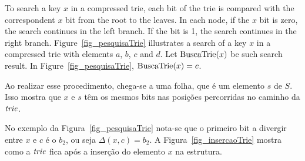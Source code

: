 \documentclass[11pt]{article}
\newcommand{\tr}{\mbox{\rm\emph{trie}}}
\newcommand{\trs}[1]{\mbox{\rm{BuscaTrie}}(#1)}
\newcommand{\dlt}[2]{\Delta(#1,#2)}
\begin{document}
To search a key $x$ in a compressed trie, each bit of the trie is compared with the correspondent $x$ bit from the root to the leaves. In each node, if the $x$ bit is zero, the search continues in the left branch. If the bit is 1, the search continues in the right branch. Figure~\ref{fig_pesquisaTrie}  illustrates a search of a key $x$ in a compressed trie with elements $a$, $b$, $c$ and $d$. Let $\trs{x}$ be such search result. In Figure~\ref{fig_pesquisaTrie},  $\trs{x}=c$.





Ao realizar esse procedimento, chega-se a uma folha, que é um elemento $s$ de $S$. Isso  mostra que $x$ e $s$ têm os mesmos bits nas posições percorridas no caminho da $\tr$.  





  No exemplo da Figura~\ref{fig_pesquisaTrie} nota-se que o primeiro bit a divergir entre $x$ e $c$ é o $b_2$,
  ou seja $\dlt{x}{c}=b_2$.
  A Figura~\ref{fig_insercaoTrie} mostra como a $\tr$ fica após a inserção do elemento $x$ na estrutura.
\end{document}
